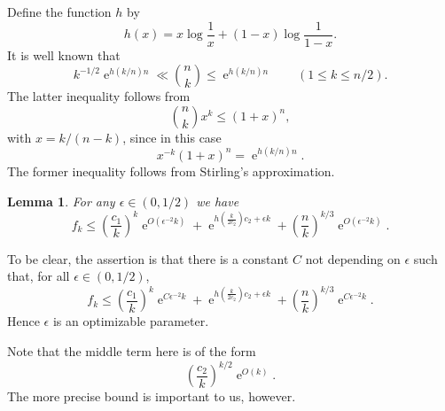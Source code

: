 \documentclass[10pt,a4paper]{amsart}
\newtheorem{lemma}[theorem]{Lemma}
\theoremstyle{remark}
\DeclareMathOperator{\expe}{e}
\newcommand{\eps}{\epsilon}
\newcommand\br[1]{\left({#1}\right)}
\newcommand\pfrac[2]{\br{\frac{#1}{#2}}}
\begin{document}
Define the function $h$ by
\[
 h(x) = x \log \frac1x + (1-x) \log\frac1{1-x}.
\]
It is well known that
\[
 k^{-1/2} \expe^{h(k/n)n} \ll \binom{n}{k} \leq \expe^{h(k/n)n} \qquad (1\leq k\leq n/2).
\]
The latter inequality follows from
\[
 \binom{n}{k} x^k \leq (1+x)^n,
\]
with $x = k/(n-k)$, since in this case
\begin{equation}
 \label{h-identity}
 x^{-k}(1+x)^n = \expe^{h(k/n)n}.
\end{equation}
The former inequality follows from Stirling's approximation.

\begin{lemma} \label{fk-bound}
For any $\eps \in (0, 1/2)$ we have
\[
 f_k \leq
 \pfrac{c_1}{k}^k \expe^{O(\eps^{-2}k)} +
 \expe^{h\pfrac{k}{2c_2} c_2 + \eps k} +
 \pfrac{n}{k}^{k/3} \expe^{O(\eps^{-2}k)}
 .
\]
\end{lemma}

To be clear, the assertion is that there is a constant $C$ not depending on $\eps$ such that, for all $\eps \in (0, 1/2)$,
\[
 f_k \leq
 \pfrac{c_1}{k}^k \expe^{C \eps^{-2}k} +
 \expe^{h\pfrac{k}{2c_2} c_2 + \eps k} +
 \pfrac{n}{k}^{k/3} \expe^{C \eps^{-2}k}
 .
\]
Hence $\eps$ is an optimizable parameter.

Note that the middle term here is of the form
\[
 \pfrac{c_2}{k}^{k/2} \expe^{O(k)}.
\]
The more precise bound is important to us, however.
\end{document}
